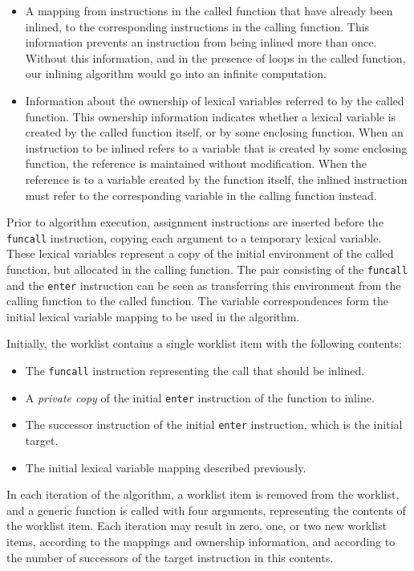 \begin{itemize}
\item A mapping from instructions in the called function that have
  already been inlined, to the corresponding instructions in the
  calling function.  This information prevents an instruction from
  being inlined more than once.  Without this information, and in the
  presence of loops in the called function, our inlining algorithm
  would go into an infinite computation.
\item Information about the ownership of lexical variables referred to
  by the called function.  This ownership information indicates
  whether a lexical variable is created by the called function itself,
  or by some enclosing function.  When an instruction to be inlined
  refers to a variable that is created by some enclosing function, the
  reference is maintained without modification.  When the reference is
  to a variable created by the function itself, the inlined
  instruction must refer to the corresponding variable in the calling
  function instead.
\end{itemize}

Prior to algorithm execution, assignment instructions are inserted
before the \texttt{funcall} instruction, copying each argument to a
temporary lexical variable.  These lexical variables represent a copy
of the initial environment of the called function, but allocated in
the calling function.  The pair consisting of the \texttt{funcall} and
the \texttt{enter} instruction can be seen as transferring this
environment from the calling function to the called function.  The
variable correspondences form the initial lexical variable mapping to
be used in the algorithm.

Initially, the worklist contains a single worklist item with the
following contents:

\begin{itemize}
\item The \texttt{funcall} instruction representing the call that
  should be inlined.
\item A \emph{private copy} of the initial \texttt{enter} instruction
  of the function to inline.
\item The successor instruction of the initial \texttt{enter}
  instruction, which is the initial target.
\item The initial lexical variable mapping described previously.
\end{itemize}

In each iteration of the algorithm, a worklist item is removed from
the worklist, and a generic function is called with four arguments,
representing the contents of the worklist item.  Each iteration may
result in zero, one, or two new worklist items, according to the
mappings and ownership information, and according to the number of
successors of the target instruction in this contents.

